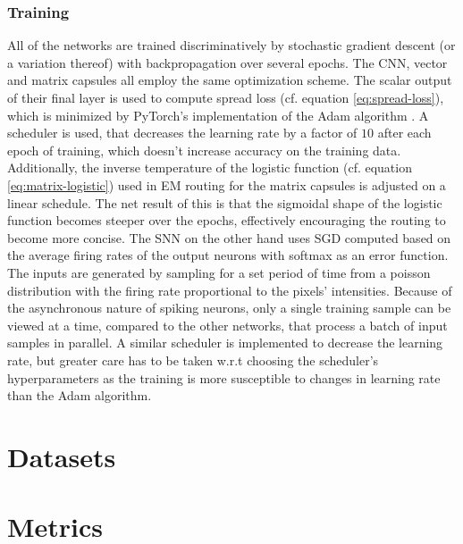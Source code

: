 \subsubsection{Training}
All of the networks are trained discriminatively by stochastic gradient descent (or a variation thereof) with backpropagation over several epochs. The CNN, vector and matrix capsules all employ the same optimization scheme. The scalar output of their final layer is used to compute spread loss (cf. equation \ref{eq:spread-loss}), which is minimized by PyTorch's implementation of the Adam algorithm \cite{kingma2014adam}. A scheduler is used, that decreases the learning rate by a factor of $\num{10}$ after each epoch of training, which doesn't increase accuracy on the training data. Additionally, the inverse temperature of the logistic function (cf. equation \ref{eq:matrix-logistic}) used in EM routing for the matrix capsules is adjusted on a linear schedule. The net result of this is that the sigmoidal shape of the logistic function becomes steeper over the epochs, effectively encouraging the routing to become more concise. The SNN on the other hand uses SGD computed based on the average firing rates of the output neurons with softmax as an error function. The inputs are generated by sampling for a set period of time from a poisson distribution with the firing rate proportional to the pixels' intensities. Because of the asynchronous nature of spiking neurons, only a single training sample can be viewed at a time, compared to the other networks, that process a batch of input samples in parallel. A similar scheduler is implemented to decrease the learning rate, but greater care has to be taken w.r.t choosing the scheduler's hyperparameters as the training is more susceptible to changes in learning rate than the Adam algorithm.
\section{Datasets}
\section{Metrics}